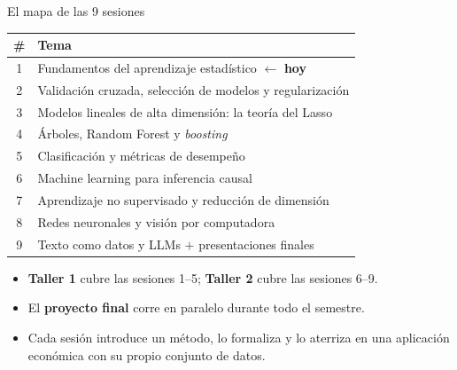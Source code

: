 \documentclass{beamer}
\newcommand{\1}{\mathbb{I}}
\begin{document}
\begin{frame}{El mapa de las 9 sesiones}
\begin{center}
\footnotesize
\begin{tabular}{cl}
\hline
\# & Tema \\
\hline
1 & Fundamentos del aprendizaje estadístico \quad $\leftarrow$ \textbf{hoy} \\
2 & Validación cruzada, selección de modelos y regularización \\
3 & Modelos lineales de alta dimensión: la teoría del Lasso \\
4 & Árboles, Random Forest y \emph{boosting} \\
5 & Clasificación y métricas de desempeño \\
6 & Machine learning para inferencia causal \\
7 & Aprendizaje no supervisado y reducción de dimensión \\
8 & Redes neuronales y visión por computadora \\
9 & Texto como datos y LLMs $+$ presentaciones finales \\
\hline
\end{tabular}
\end{center}

\vspace{0.3cm}
\small
\begin{itemize}\itemsep3pt
  \item \textbf{Taller 1} cubre las sesiones 1--5; \textbf{Taller 2} cubre las sesiones 6--9.
  \item El \textbf{proyecto final} corre en paralelo durante todo el semestre.
  \item Cada sesión introduce un método, lo formaliza y lo aterriza en una aplicación económica con su propio conjunto de datos.
\end{itemize}
\end{frame}
\end{document}
